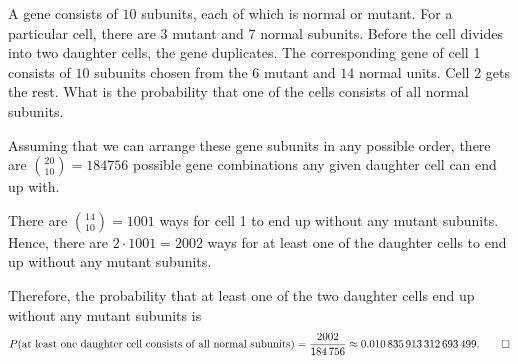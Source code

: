 \begin{problem}[Handout 1, \# 7]
  A gene consists of \(10\) subunits, each of which is normal or
  mutant. For a particular cell, there are \(3\) mutant and \(7\) normal
  subunits. Before the cell divides into two daughter cells, the gene
  duplicates. The corresponding gene of cell 1 consists of \(10\) subunits
  chosen from the \(6\) mutant and \(14\) normal units. Cell 2 gets the
  rest. What is the probability that one of the cells consists of all
  normal subunits.
\end{problem}
\begin{solution*}
  Assuming that we can arrange these gene subunits in any possible order,
  there are \(\binom{20}{10}=\num{184756}\) possible gene combinations any
  given daughter cell can end up with.

  There are \(\binom{14}{10}=1001\) ways for cell 1 to end up without any
  mutant subunits. Hence, there are \(2\cdot 1001=2002\) ways for at least
  one of the daughter cells to end up without any mutant subunits.

  Therefore, the probability that at least one of the two daughter cells
  end up without any mutant subunits is
  \[
    P(\text{at least one daughter cell consists of all normal subunits})
    =\frac{2002}{\num{184756}}
    \approx\num{0.010835913312693499}.\qedhere
  \]
\end{solution*}

